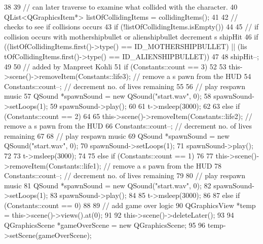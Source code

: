 \begin{DoxyCode}
38 {
39     // can later traverse to examine what collided with the character.
40     QList<QGraphicsItem*> listOfCollidingItems = collidingItems();
41 
42     // checks to see if collisions occurs
43     if (!listOfCollidingItems.isEmpty())
44     {
45         // if collision occurs with mothershipbullet or alienshipbullet decrement
      s shipHit
46         if ((listOfCollidingItems.first()->type() == ID_MOTHERSHIPBULLET) || (lis
      tOfCollidingItems.first()->type() == ID_ALIENSHIPBULLET))
47         {
48             shipHit--;
49 
50             // added by Manpreet Kohli
51             if (Constants::count == 3)
52             {
53                 this->scene()->removeItem(Constants::life3);        // remove a s
      pawn from the HUD
54                 Constants::count--;                                 // decrement 
      no. of lives remaining
55 
56                 // play respawn music
57                 QSound *spawnSound = new QSound("start.wav", 0);
58                 spawnSound->setLoops(1);
59                 spawnSound->play();
60 
61                 t->msleep(3000);
62             }           
63             else if (Constants::count == 2)
64             {
65                 this->scene()->removeItem(Constants::life2);        // remove a s
      pawn from the HUD
66                 Constants::count--;                                 // decrement 
      no. of lives remaining
67 
68                 // play respawn music
69                 QSound *spawnSound = new QSound("start.wav", 0);
70                 spawnSound->setLoops(1);
71                 spawnSound->play();
72 
73                 t->msleep(3000);
74             }            
75             else if (Constants::count == 1)
76             {
77                 this->scene()->removeItem(Constants::life1);        // remove a s
      pawn from the HUD
78                 Constants::count--;                                 // decrement 
      no. of lives remaining
79 
80                 // play respawn music
81                 QSound *spawnSound = new QSound("start.wav", 0);
82                 spawnSound->setLoops(1);
83                 spawnSound->play();
84 
85                 t->msleep(3000);
86             }      
87             else if (Constants::count == 0)
88             {
89                 // add game over logic
90                 QGraphicsView *temp  = this->scene()->views().at(0);
91 
92                 this->scene()->deleteLater();
93 
94                 QGraphicsScene *gameOverScene = new QGraphicsScene;
95 
96                 temp->setScene(gameOverScene);
}}}}
\end{DoxyCode}
